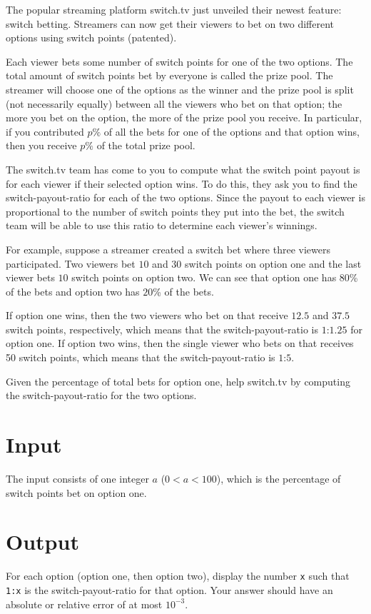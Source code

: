 
The popular streaming platform switch.tv just unveiled their
newest feature: switch betting.  Streamers can now get their viewers
to bet on two different options using switch points (patented).

Each viewer bets some number of switch points for one of the two
options. The total amount of switch points bet by everyone is called
the prize pool. The streamer will choose one of the options as the winner
and the prize pool is split (not necessarily equally) between all the
viewers who bet on that option; the more you bet on the option, the more
of the prize pool you receive. In particular, if you contributed $p\%$
of all the bets for one of the options and that option wins, then you
receive $p\%$ of the total prize pool.

The switch.tv team has come to you to compute what the switch point
payout is for each viewer if their selected option wins. To
do this, they ask you to find the switch-payout-ratio for each of
the two options. Since the payout to each viewer is proportional
to the number of switch points they put into the bet, the switch
team will be able to use this ratio to determine each viewer's
winnings.

For example, suppose a streamer created a switch bet where three
viewers participated. Two viewers bet $10$ and $30$ switch points on
option one and the last viewer bets $10$ switch points on option two.
We can see that option one has $80$\% of the bets and option
two has $20$\% of the bets.

If option one wins, then the two viewers who bet on that receive
$12.5$ and $37.5$ switch points, respectively, which means that
the switch-payout-ratio is $1$:$1.25$ for option one. If
option two wins, then the single viewer who bets on that
receives 50 switch points, which means that the switch-payout-ratio
is $1$:$5$.

Given the percentage of total bets for option one, help
switch.tv by computing the switch-payout-ratio for the two options.

\section*{Input}

The input consists of one integer $a$ ($0 < a < 100$), which is the
percentage of switch points bet on option one.

\section*{Output}

For each option (option one, then option two), display the number
\verb|x| such that \verb|1:x| is the switch-payout-ratio for
that option.
Your answer should have an absolute or relative error of at 
most $10^{-3}$.

